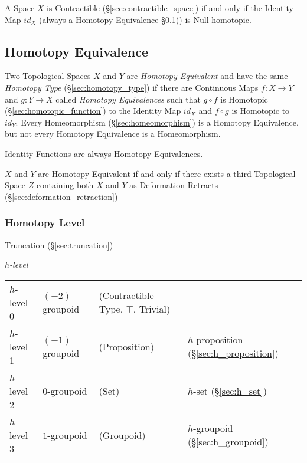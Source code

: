 A Space $X$ is Contractible (\S\ref{sec:contractible_space}) if and
only if the Identity Map $id_X$ (always a Homotopy Equivalence
\S\ref{sec:homotopy_equivalence})) is Null-homotopic.



\subsection{Homotopy Equivalence}\label{sec:homotopy_equivalence}

Two Topological Spaces $X$ and $Y$ are \emph{Homotopy Equivalent} and
have the same \emph{Homotopy Type} (\S\ref{sec:homotopy_type}) if
there are Continuous Maps $f : X \rightarrow Y$ and $g : Y \rightarrow
X$ called \emph{Homotopy Equivalences} such that $g \circ f$ is
Homotopic (\S\ref{sec:homotopic_function}) to the Identity Map $id_X$
and $f \circ g$ is Homotopic to $id_Y$. Every Homeomorphism
(\S\ref{sec:homeomorphism}) is a Homotopy Equivalence, but not every
Homotopy Equivalence is a Homeomorphism.

Identity Functions are always Homotopy Equivalences. %

$X$ and $Y$ are Homotopy Equivalent if and only if there exists a
third Topological Space $Z$ containing both $X$ and $Y$ as Deformation
Retracts (\S\ref{sec:deformation_retraction})



\subsubsection{Homotopy Level}\label{sec:homotopy_level}

Truncation (\S\ref{sec:truncation})

\emph{$h$-level}

\begin{tabular}{l l l l}
$h$-level 0   & $(-2)$-groupoid & (Contractible Type, $\top$, Trivial)
  & \\
$h$-level 1   & $(-1)$-groupoid & (Proposition)
  & $h$-proposition (\S\ref{sec:h_proposition}) \\
$h$-level 2   & $0$-groupoid    & (Set)
  & $h$-set (\S\ref{sec:h_set}) \\
$h$-level 3   & $1$-groupoid    & (Groupoid)
  & $h$-groupoid (\S\ref{sec:h_groupoid}) \\
\end{tabular}



